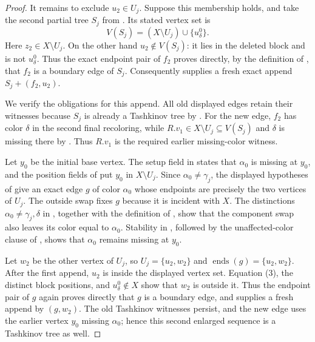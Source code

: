 \begin{proof}
It remains to exclude $u_2\in U_j$.  Suppose this membership holds, and
take the second partial tree $S_j$ from
.  Its stated vertex set is
\[
 V(S_j)=(X\setminus U_j)\cup\{u^0_\delta\}.
 \tag{3}
\]
Here $z_2\in X\setminus U_j$.  On the other hand $u_2\notin V(S_j)$:
it lies in the deleted block and is not $u^0_\delta$.  Thus the exact
endpoint pair of $f_2$ proves directly, by the definition of
, that $f_2$ is a boundary edge of $S_j$.
Consequently  supplies a
fresh exact append $S_j+(f_2,u_2)$.

We verify the  obligations for this append.  All
old displayed edges retain their witnesses because $S_j$ is already a
Tashkinov tree by .  For the
new edge, $f_2$ has color $\delta$ in the second final recoloring, while
$R.v_1\in X\setminus U_j\subseteq V(S_j)$ and $\delta$ is missing there
by .  Thus
$R.v_1$ is the required earlier missing-color witness.

Let $y_0$ be the initial base vertex.  The setup field in
 states that $\alpha _0$ is missing at
$y_0$, and the position fields of
 put $y_0$ in
$X\setminus U_j$.  Since $\alpha _0\ne\gamma_j$, the displayed
hypotheses of  give an exact
edge $g$ of color $\alpha _0$ whose endpoints are precisely the two
vertices of $U_j$.  The outside swap fixes $g$ because it is incident
with $X$.  The distinctions
$\alpha _0\ne\gamma_j,\delta$ in
, together with the definition of
, show that the component swap also
leaves its color equal to $\alpha _0$.  Stability in
, followed by the
unaffected-color clause of
, shows that
$\alpha _0$ remains missing at $y_0$.

Let $w_2$ be the other vertex of $U_j$, so
$U_j=\{u_2,w_2\}$ and
$\operatorname{ends}(g)=\{u_2,w_2\}$.  After the first append, $u_2$ is
inside the displayed vertex set.  Equation (3), the distinct block
positions, and $u^0_\delta\notin X$ show that $w_2$ is outside it.
Thus the endpoint pair of $g$ again proves directly that $g$ is a
boundary edge, and 
supplies a fresh append by $(g,w_2)$.  The old Tashkinov witnesses persist,
and the new edge uses the earlier vertex $y_0$ missing $\alpha _0$;
hence this second enlarged sequence is a Tashkinov tree as well.


\end{proof}
